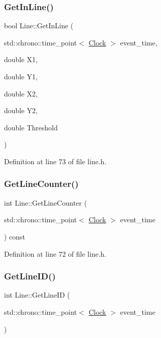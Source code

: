 \subsubsection{\texorpdfstring{Get\+In\+Line()}{GetInLine()}}
{\footnotesize\ttfamily bool Line\+::\+Get\+In\+Line (\begin{DoxyParamCaption}\item[{std\+::chrono\+::time\+\_\+point$<$ \hyperlink{universe_8h_a0ef8d951d1ca5ab3cfaf7ab4c7a6fd80}{Clock} $>$}]{event\+\_\+time,  }\item[{double}]{X1,  }\item[{double}]{Y1,  }\item[{double}]{X2,  }\item[{double}]{Y2,  }\item[{double}]{Threshold }\end{DoxyParamCaption})\hspace{0.3cm}{\ttfamily [inline]}}



Definition at line 73 of file line.\+h.

\mbox{\label{class_line_ac13c6405cfd2a586633b5a5eece05fff}} 
\subsubsection{\texorpdfstring{Get\+Line\+Counter()}{GetLineCounter()}}
{\footnotesize\ttfamily int Line\+::\+Get\+Line\+Counter (\begin{DoxyParamCaption}\item[{std\+::chrono\+::time\+\_\+point$<$ \hyperlink{universe_8h_a0ef8d951d1ca5ab3cfaf7ab4c7a6fd80}{Clock} $>$}]{event\+\_\+time }\end{DoxyParamCaption}) const\hspace{0.3cm}{\ttfamily [inline]}}



Definition at line 72 of file line.\+h.

\mbox{\label{class_line_a20756feda4d42032955ec6cf12d89941}} 
\subsubsection{\texorpdfstring{Get\+Line\+I\+D()}{GetLineID()}}
{\footnotesize\ttfamily int Line\+::\+Get\+Line\+ID (\begin{DoxyParamCaption}\item[{std\+::chrono\+::time\+\_\+point$<$ \hyperlink{universe_8h_a0ef8d951d1ca5ab3cfaf7ab4c7a6fd80}{Clock} $>$}]{event\+\_\+time }\end{DoxyParamCaption})\hspace{0.3cm}{\ttfamily [inline]}}



